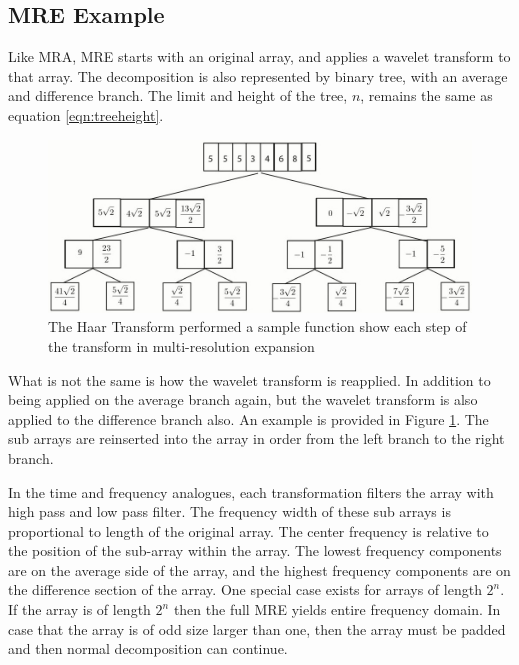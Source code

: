 \subsection {MRE Example}

Like MRA, MRE starts with an original array, and applies a wavelet transform to that array.  The decomposition is also represented by binary tree, with an average and difference branch.  The limit and height of the tree, $n$, remains the same as equation \ref{eqn:treeheight}.

\begin{figure}
\includegraphics [width=6.5in]{numexample01_2.jpg}
\caption{The Haar Transform performed a sample function show each step of the transform in multi-resolution expansion }
\label{nummre}
\end{figure}

What is not the same is how the wavelet transform is reapplied.  In
addition to being applied on the average branch again, but the wavelet
transform is also applied to the difference branch also.  An example
is provided in Figure \ref{nummre}. The sub arrays are reinserted into
the array in order from the left branch to the right branch.

In the time and frequency analogues, each transformation filters the
array with high pass and low pass filter.  The frequency width of
these sub arrays is proportional to length of the original array.  The
center frequency is relative to the position of the sub-array within
the array.  The lowest frequency components are on the average side of
the array, and the highest frequency components are on the difference
section of the array.  One special case exists for arrays of length
$2^n$.  If the array is of length $2^n$ then the full MRE yields
entire frequency domain.  In case that the array is of odd size larger
than one, then the array must be padded and then normal decomposition
can continue.

  
